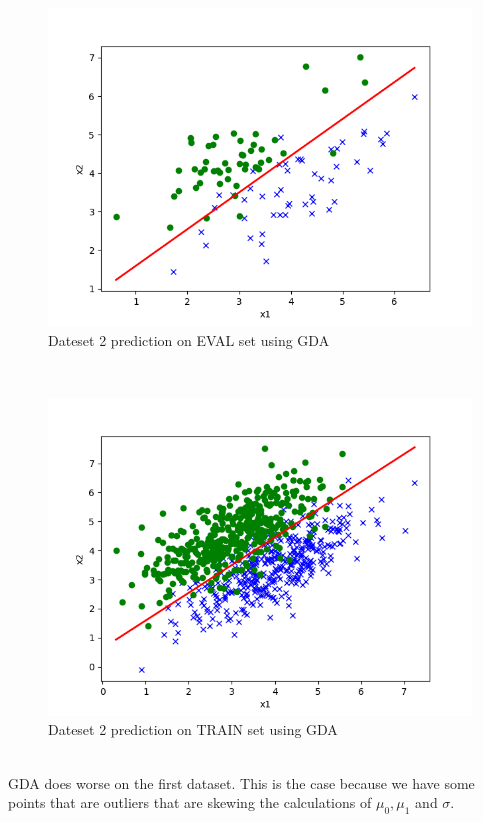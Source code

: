 \begin{answer}
\begin{figure}
  \includegraphics[width=\linewidth]{../src/output/p01e_pred_2_eval.png}
  \caption{Dateset 2 prediction on EVAL set using GDA}
  \label{fig:Dateset 2 prediction on EVAL set using GDA}
\end{figure}\\
\begin{figure}
  \includegraphics[width=\linewidth]{../src/output/p01e_pred_2_train.png}
  \caption{Dateset 2 prediction on TRAIN set using GDA}
  \label{fig:Dateset 2 prediction on TRAIN set using GDA}
\end{figure}\\
GDA does worse on the first dataset. This is the case because we have some points that are outliers that are skewing the calculations of $\mu_0, \mu_1$ and $\sigma$. 
\end{answer}
